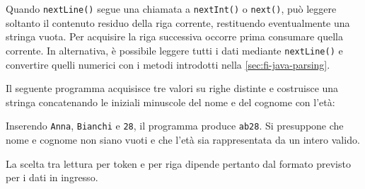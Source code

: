Quando \texttt{nextLine()} segue una chiamata a
\texttt{nextInt()} o \texttt{next()}, può leggere
soltanto il contenuto residuo della riga corrente,
restituendo eventualmente una stringa vuota.
Per acquisire la riga successiva occorre prima
consumare quella corrente. In alternativa, è
possibile leggere tutti i dati mediante
\texttt{nextLine()} e convertire quelli numerici
con i metodi introdotti nella
\cref{sec:fi-java-parsing}.

\begin{example}
Il seguente programma acquisisce tre valori su
righe distinte e costruisce una stringa concatenando
le iniziali minuscole del nome e del cognome con
l'età:



Inserendo \texttt{Anna}, \texttt{Bianchi} e
\texttt{28}, il programma produce \texttt{ab28}.
Si presuppone che nome e cognome non siano vuoti
e che l'età sia rappresentata da un intero valido.
\end{example}

La scelta tra lettura per token e per riga
dipende pertanto dal formato previsto per
i dati in ingresso.
